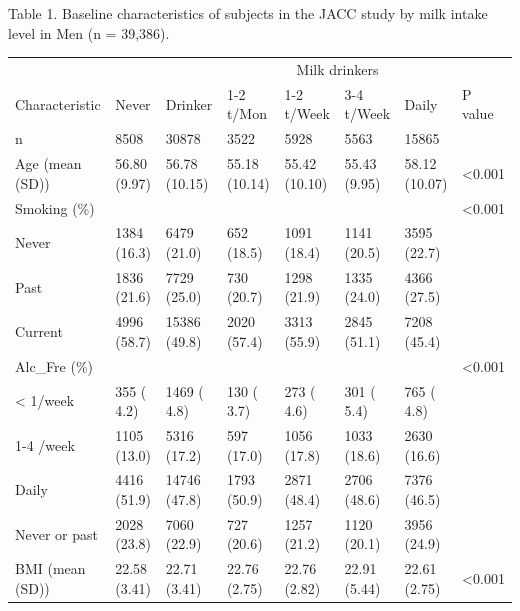 \documentclass[]{tufte-handout}
\begin{document}
\begin{table}[ht]

Table 1. Baseline characteristics of subjects in the JACC study by milk intake level in Men (n = 39,386).

\centering
\fontsize{8}{10}\selectfont
\begin{tabular}[t]{llllllll}
\toprule
\multicolumn{1}{c}{ } & \multicolumn{1}{c}{} & \multicolumn{1}{c}{} & \multicolumn{4}{c}{Milk drinkers} & \multicolumn{1}{c}{} \\
\cmidrule(l{3pt}r{3pt}){4-7}
Characteristic & Never & Drinker & 1-2 t/Mon & 1-2 t/Week & 3-4 t/Week & Daily & P value\\
\midrule
\rowcolor{gray!6}  n & 8508 & 30878 & 3522 & 5928 & 5563 & 15865 & \\
Age (mean (SD)) & 56.80 (9.97) & 56.78 (10.15) & 55.18 (10.14) & 55.42 (10.10) & 55.43 (9.95) & 58.12 (10.07) & <0.001\\
\rowcolor{gray!6}  Smoking (\%) &  &  &  &  &  &  & <0.001\\
\hspace{1em}Never & 1384 (16.3) & 6479 (21.0) & 652 (18.5) & 1091 (18.4) & 1141 (20.5) & 3595 (22.7) & \\
\rowcolor{gray!6}  \hspace{1em}Past & 1836 (21.6) & 7729 (25.0) & 730 (20.7) & 1298 (21.9) & 1335 (24.0) & 4366 (27.5) & \\
\hspace{1em}Current & 4996 (58.7) & 15386 (49.8) & 2020 (57.4) & 3313 (55.9) & 2845 (51.1) & 7208 (45.4) & \\
\rowcolor{gray!6}  Alc\_Fre (\%) &  &  &  &  &  &  & <0.001\\
\hspace{1em}< 1/week & 355 ( 4.2) & 1469 ( 4.8) & 130 ( 3.7) & 273 ( 4.6) & 301 ( 5.4) & 765 ( 4.8) & \\
\rowcolor{gray!6}  \hspace{1em}1-4 /week & 1105 (13.0) & 5316 (17.2) & 597 (17.0) & 1056 (17.8) & 1033 (18.6) & 2630 (16.6) & \\
\hspace{1em}Daily & 4416 (51.9) & 14746 (47.8) & 1793 (50.9) & 2871 (48.4) & 2706 (48.6) & 7376 (46.5) & \\
\rowcolor{gray!6}  \hspace{1em}Never or past & 2028 (23.8) & 7060 (22.9) & 727 (20.6) & 1257 (21.2) & 1120 (20.1) & 3956 (24.9) & \\
BMI (mean (SD)) & 22.58 (3.41) & 22.71 (3.41) & 22.76 (2.75) & 22.76 (2.82) & 22.91 (5.44) & 22.61 (2.75) & <0.001\\

\end{tabular}
\end{table}
\end{document}
